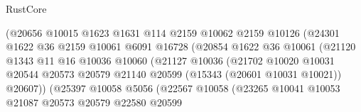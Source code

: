 \begin{lexlean}{RustCore}
\begin{coremodule}
                                    (@20656
                                      @10015
                                      @1623
                                      @1631
                                      @114
                                      @2159
                                      @10062
                                      @2159
                                      @10126
                                      (@24301
                                        @1622
                                        @36
                                        @2159
                                        @10061
                                        @6091
                                        @16728
                                        (@20854
                                          @1622
                                          @36
                                          @10061
                                          (@21120
                                            @1343
                                            @11
                                            @16
                                            @10036
                                            @10060
                                            (@21127
                                              @10036
                                              (@21702
                                                @10020
                                                @10031
                                                @20544
                                                @20573
                                                @20579
                                                @21140
                                                @20599
                                                (@15343 (@20601 @10031 @10021))
                                                @20607))
                                            (@25397
                                              @10058
                                              @5056
                                              (@22567
                                                @10058
                                                (@23265
                                                  @10041
                                                  @10053
                                                  @21087
                                                  @20573
                                                  @20579
                                                  @22580
                                                  @20599

\end{coremodule}
\end{lexlean}
